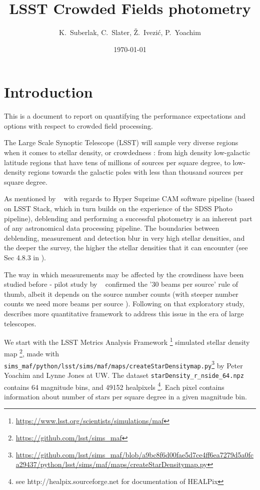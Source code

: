 \documentclass[DM,lsstdraft,toc,usenatbib]{lsstdoc}
\title[Crowded fields ]{LSST  Crowded Fields photometry}
\author{
K.~Suberlak, C.~Slater,
\v{Z}.~Ivezi\'c, P.~Yoachim}
\date{\today}
\begin{document}
\maketitle

\section{Introduction}

This is a document to report on quantifying the performance expectations and options with respect to crowded field processing.

The Large Scale Synoptic Telescope (LSST) will sample very diverse regions when it comes to stellar density, or crowdedness : from high density low-galactic latitude regions that have tens of millions of sources per square degree, to low-density regions towards the galactic poles with less than thousand sources per square degree. 

As mentioned by ~\cite{bosch2017} with regards to Hyper Suprime CAM software pipeline (based on LSST Stack, which in turn builds on the experience of the SDSS  Photo pipeline), deblending and performing a successful photometry is an inherent part of any astronomical data processing pipeline. The boundaries between deblending, measurement and detection blur in very high stellar densities, and the deeper the survey, the higher the stellar densities that it can encounter (see Sec 4.8.3 in \cite{bosch2017}). 

The way in which measurements may be affected by the crowdiness have been studied before - pilot study by ~\citep{hogg2001} confirmed the '30 beams per source' rule of thumb, albeit it depends on the source number counts (with steeper number counts we need more beams per source ). Following on that exploratory study,  ~\cite{olsen2003} describes more quantitative framework to address this issue in the era of large telescopes. 

We start with the LSST  Metrics Analysis Framework \footnote{\url{https://www.lsst.org/scientists/simulations/maf}} simulated stellar density map \footnote{\url{https://github.com/lsst/sims_maf}}, made with \verb|sims_maf/python/lsst/sims/maf/maps/createStarDensitymap.py|\footnote{\url{https://github.com/lsst/sims_maf/blob/a9bc8f6d00fae5d7ce4ff6ea7279d5a0fca29437/python/lsst/sims/maf/maps/createStarDensitymap.py}} by Peter Yoachim and Lynne Jones at UW. The dataset \verb|starDensity_r_nside_64.npz| contains 64 magnitude bins, and 49152  healpixels \footnote{see http://healpix.sourceforge.net for documentation of HEALPix}. Each pixel contains information about number of stars per square degree in a given magnitude bin.  
\end{document}
